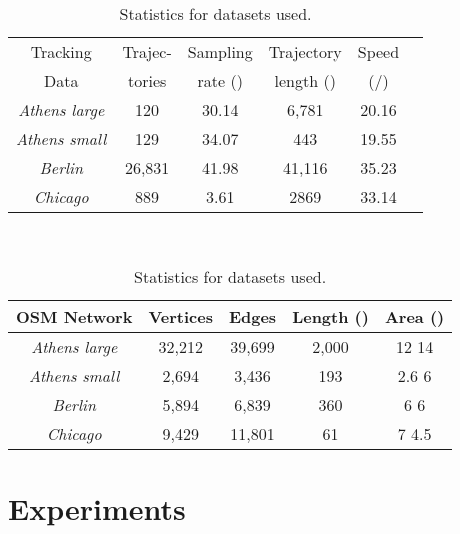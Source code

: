 \documentclass[natbib]{svjour3}                    \smartqed  \usepackage[table]{xcolor}
\begin{document}
\begin{table}
	[t] \centering \scriptsize 
	\begin{tabular}
		{|c||c|c|c|c|c|} \hline Tracking & Trajec- & Sampling & Trajectory & Speed \\
		Data & tories & rate () & length () & (/) \\
		\hline \hline \emph{Athens large} & 120 & 30.14 & 6,781 & 20.16 \\
		\hline \emph{Athens small} & 129  & 34.07 & 443 & 19.55 \\
		\hline \emph{Berlin} & 26,831 & 41.98 & 41,116 & 35.23 \\
		\hline \emph{Chicago} & 889 & 3.61 & 2869 & 33.14 \\
		\hline 
	\end{tabular}
	\\
	\vspace{10pt} 
	\begin{tabular}
		{|c||c|c|c|c|} \hline OSM Network & Vertices & Edges & Length () & Area () \\
		\hline \hline \emph{Athens large} & 32,212 & 39,699 & 2,000 & 12  14 \\
		\hline \emph{Athens small} & 2,694 & 3,436 & 193 & 2.6  6 \\
		\hline \emph{Berlin} & 5,894 & 6,839 & 360 & 6  6 \\
		\hline \emph{Chicago} & 9,429 & 11,801 & 61 & 7  4.5 \\
		\hline 
	\end{tabular}
	\caption{Statistics for datasets used.} \label{tab:dstatistics}  
\end{table}


\section{Experiments}
\label{sec:sec_exp}
\end{document}
